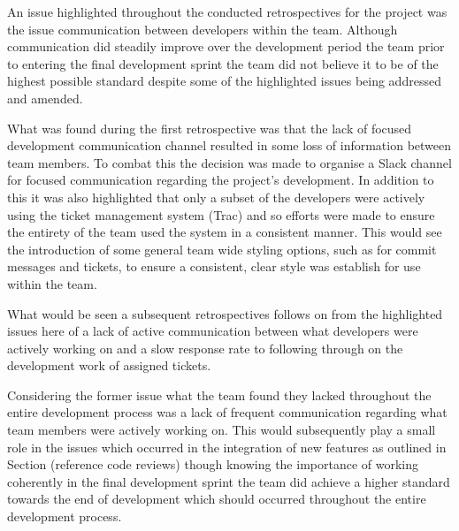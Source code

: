\documentclass{l3proj}
\begin{document}

An issue highlighted throughout the conducted retrospectives for the project was the issue communication between developers within the team. Although communication did steadily improve over the development period the team prior to entering the final development sprint the team did not believe it to be of the highest possible standard despite some of the highlighted issues being addressed and amended. 

What was found during the first retrospective was that the lack of focused development communication channel resulted in some loss of information between team members. To combat this the decision was made to organise a Slack channel for focused communication regarding the project's development. In addition to this it was also highlighted that only a subset of the developers were actively using the ticket management system (Trac) and so efforts were made to ensure the entirety of the team used the system in a consistent manner. This would see the introduction of some general team wide styling options, such as for commit messages and tickets, to ensure a consistent, clear style was  establish for use within the team. 

What would be seen a subsequent retrospectives follows on from the highlighted issues here of a lack of active communication between what developers were actively working on and a slow response rate to following through on the development work of assigned tickets. 

Considering the former issue what the team found they lacked throughout the entire development process was a lack of frequent communication regarding what team members were actively working on. This would subsequently play a small role in the issues which occurred in the integration of new features as outlined in Section (reference code reviews) though knowing the importance of working coherently in the final development sprint the team did achieve a higher standard towards the end of development which should occurred throughout the entire development process. 
\end{document}
